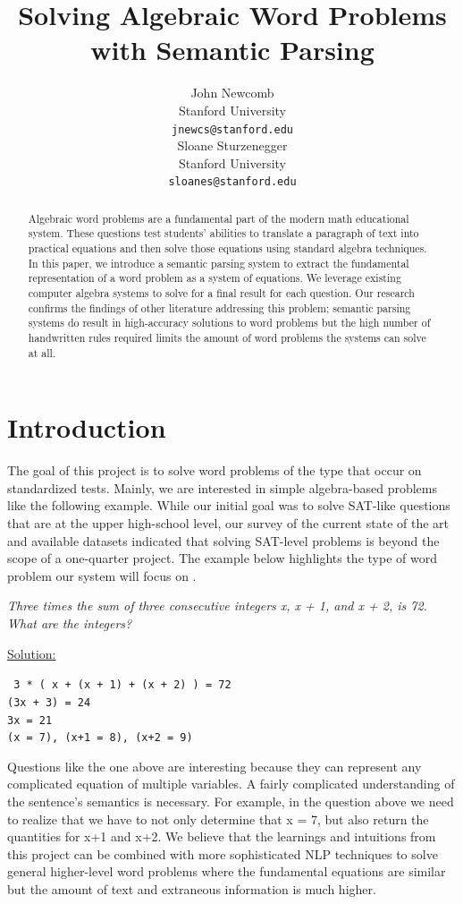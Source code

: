\documentclass[11pt]{article}
\title{Solving Algebraic Word Problems with Semantic Parsing}
\author{John Newcomb \\
  Stanford University \\
  {\tt jnewcs@stanford.edu} \\\And
  Sloane Sturzenegger \\
  Stanford University \\
  {\tt sloanes@stanford.edu} \\}
\date{}
\begin{document}
\maketitle
\begin{abstract}
Algebraic word problems are a fundamental part of the modern math educational system. These questions test students' abilities to translate a paragraph of text into practical equations and then solve those equations using standard algebra techniques. In this paper, we introduce a semantic parsing system to extract the fundamental representation of a word problem as a system of equations. We leverage existing computer algebra systems to solve for a final result for each question. Our research confirms the findings of other literature addressing this problem; semantic parsing systems do result in high-accuracy solutions to word problems but the high number of handwritten rules required limits the amount of word problems the systems can solve at all.
\end{abstract}

\section{Introduction}
The goal of this project is to solve word problems of the type that occur on standardized tests. Mainly, we are interested in simple algebra-based problems like the following example. While our initial goal was to solve SAT-like questions that are at the upper high-school level, our survey of the current state of the art and available datasets indicated that solving SAT-level problems is beyond the scope of a one-quarter project. The example below highlights the type of word problem our system will focus on \cite{Shi:15}.

\textit{Three times the sum of three consecutive integers x, x + 1, and x + 2, is 72. What are the integers?}

\underline{Solution:}
\begin{center}
    \small{\texttt{
        3 * ( x + (x + 1) + (x + 2) ) = 72\\
        (3x + 3) = 24\\
        3x = 21\\
        (x = 7), (x+1 = 8), (x+2 = 9)
    }}
\end{center}

Questions like the one above are interesting because they can represent any complicated equation of multiple variables. A fairly complicated understanding of the sentence's semantics is necessary. For example, in the question above we need to realize that we have to not only determine that x = 7, but also return the quantities for x+1 and x+2. We believe that the learnings and intuitions from this project can be combined with more sophisticated NLP techniques to solve general higher-level word problems where the fundamental equations are similar but the amount of text and extraneous information is much higher.
\end{document}
